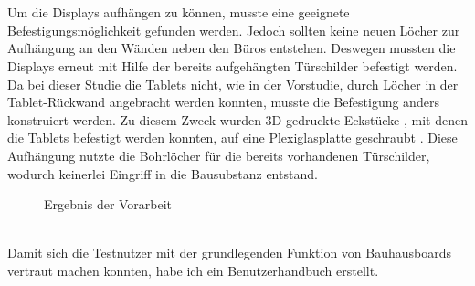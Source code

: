 \\
\\
Um die Displays aufhängen zu können, musste eine geeignete Befestigungsmöglichkeit gefunden werden.
Jedoch sollten keine neuen Löcher zur Aufhängung an den Wänden neben den Büros entstehen.
Deswegen mussten die Displays erneut mit Hilfe der bereits aufgehängten Türschilder befestigt werden.
Da bei dieser Studie die Tablets nicht, wie in der Vorstudie, durch Löcher in der Tablet-Rückwand angebracht werden konnten, musste die Befestigung anders konstruiert werden.
Zu diesem Zweck wurden 3D gedruckte Eckstücke , mit denen die Tablets befestigt werden konnten, auf eine Plexiglasplatte geschraubt .
Diese Aufhängung nutzte die Bohrlöcher für die bereits vorhandenen Türschilder, wodurch keinerlei Eingriff in die Bausubstanz entstand.
\begin{figure}%
  \centering
  \caption{Ergebnis der Vorarbeit}
  \label{img:Vorarbeit}
\end{figure}
\\
Damit sich die Testnutzer mit der grundlegenden Funktion von Bauhausboards vertraut machen konnten, habe ich ein Benutzerhandbuch erstellt.


